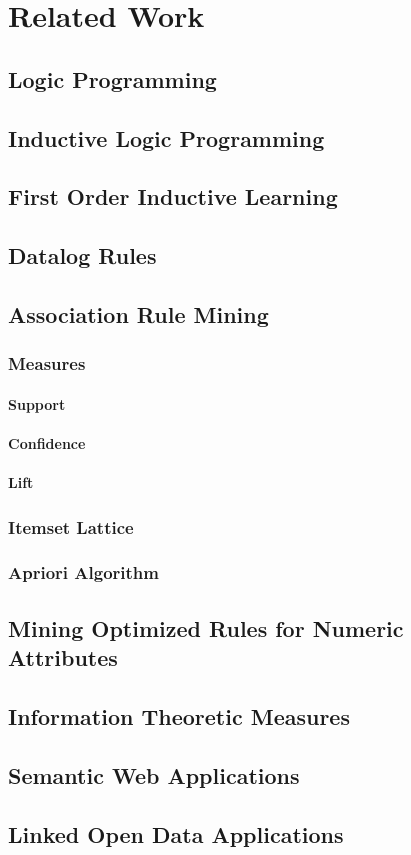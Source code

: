 \chapter{Related Work}
\label{rw:intro}

\section{Logic Programming}
\section{Inductive Logic Programming}
\section{First Order Inductive Learning}
\section{Datalog Rules}
\section{Association Rule Mining}
\subsection{Measures}
\subsubsection{Support}
\subsubsection{Confidence}
\subsubsection{Lift}
\subsection{Itemset Lattice}
\subsection{Apriori Algorithm}

\section{Mining Optimized Rules for Numeric Attributes}

\cite{Brin99miningoptimized}

\section{Information Theoretic Measures}

\cite{DBLP:conf/sac/CaldersGPR09}

\section{Semantic Web Applications}
\section{Linked Open Data Applications}